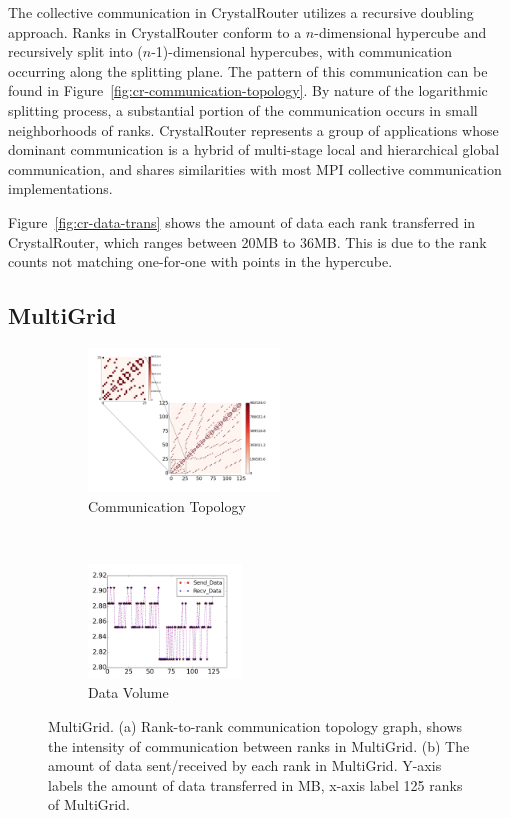 \documentclass[conference]{IEEEtran}
\begin{document}
The collective communication in CrystalRouter utilizes a recursive doubling approach. Ranks in CrystalRouter conform to a $n$-dimensional hypercube and recursively split into ($n$-1)-dimensional hypercubes, with communication occurring along the splitting plane. The pattern of this communication can be found in Figure~\ref{fig:cr-communication-topology}. By nature of the logarithmic splitting process, a substantial portion of the communication occurs in small neighborhoods of ranks. CrystalRouter represents a group of applications whose dominant communication is a hybrid of multi-stage local and hierarchical global communication, and shares similarities with most MPI collective communication implementations.

Figure~\ref{fig:cr-data-trans} shows the amount of data each rank transferred in CrystalRouter, which ranges between 20MB to 36MB. This is due to the rank counts not matching one-for-one with points in the hypercube.

\subsection{MultiGrid}
\label{sec:multigrid}

\begin{figure}[t!]
    \centering
    \begin{subfigure}[t]{0.25\textwidth}
        \centering
        \includegraphics[height=1.5in]{figs/appstudy/mg/mg_pip}
        \caption{Communication Topology}
        \label{fig:mg-communication-topology}
    \end{subfigure}
    ~
    \begin{subfigure}[t]{0.22\textwidth}
        \centering
        \includegraphics[height=1.2in]{figs/appstudy/mg/mg_data_transfer}
        \caption{Data Volume}
        \label{fig:mg-data-trans}
    \end{subfigure}
    \caption{MultiGrid. (a) Rank-to-rank communication topology graph, shows the intensity of communication between ranks in MultiGrid. (b) The amount of data sent/received by each rank in MultiGrid. Y-axis labels the amount of data transferred in MB, x-axis label 125 ranks of MultiGrid. }
\end{figure}
\end{document}
